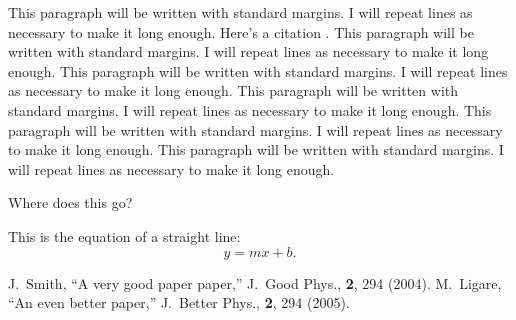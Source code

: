 \documentclass[numbib]{buthesis_p}  %
\begin{document}
This paragraph will be written with standard margins. I will repeat
lines as necessary to make it long enough. Here's a citation \citep{LIG05}.
This paragraph will be
written with standard margins. I will repeat lines as necessary to
make it long enough. This paragraph will be written with standard
margins. I will repeat lines as necessary to make it long enough. This
paragraph will be written with standard margins. I will repeat lines
as necessary to make it long enough. This paragraph will be written
with standard margins. I will repeat lines as necessary to make it
long enough. This paragraph will be written with standard margins. I
will repeat lines as necessary to make it long enough.

Where does this go?

This is the equation of a straight line:
\begin{equation}
y = mx + b.
\end{equation}


%


\begin{thebibliography}{99}
J.~Smith, ``A very good paper paper,''  
J.~Good Phys., {\bf 2}, 294 (2004).
M.~Ligare, ``An even better paper,''
J.~Better Phys., {\bf 2}, 294 (2005).
\end{thebibliography}
\end{document}
